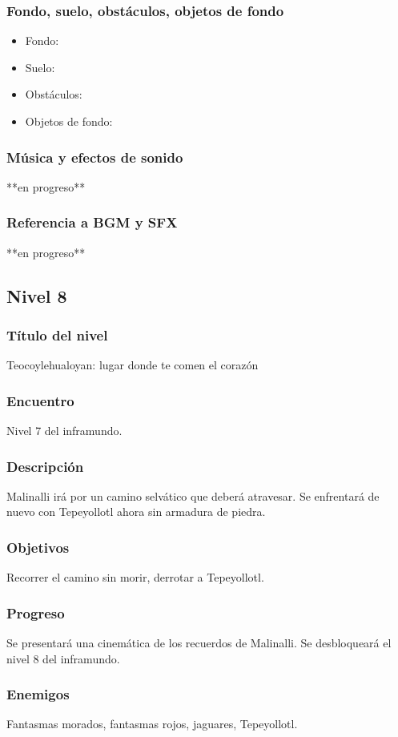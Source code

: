 \documentclass[11pt,letterpaper]{article}
\begin{document}
	\subsubsection{Fondo, suelo, obstáculos, objetos de fondo}
\begin{itemize} 
	\item Fondo:
	\item Suelo:
	\item Obstáculos:
	\item Objetos de fondo:
\end{itemize}	
	\subsubsection{Música y efectos de sonido}
	**en progreso**
	\subsubsection{Referencia a BGM y SFX}
	**en progreso**
	
	
		\subsection{Nivel 8}
	\subsubsection{Título del nivel}
	Teocoylehualoyan: lugar donde te comen el corazón
	\subsubsection{Encuentro}
	Nivel 7 del inframundo.
	\subsubsection{Descripción}
	Malinalli irá por un camino selvático que deberá atravesar. Se enfrentará de nuevo con Tepeyollotl ahora sin armadura de piedra.
	\subsubsection{Objetivos}
	Recorrer el camino sin morir, derrotar a Tepeyollotl.
	\subsubsection{Progreso}
	Se presentará una cinemática de los recuerdos de Malinalli. Se desbloqueará el nivel 8 del inframundo.
	\subsubsection{Enemigos}
	Fantasmas morados, fantasmas rojos, jaguares, Tepeyollotl.
\end{document}
